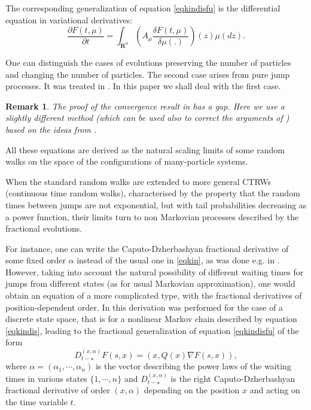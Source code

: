 \documentclass[12pt]{article}
\def\R{\mathbf{R}}
\def\al{\alpha}
\def\pa{\partial}
\def\de{\delta}
\numberwithin{equation}{section}
\newtheorem{remark}{Remark}
\begin{document}
The corresponding generalization of equation \eqref{eqkindisfu} is the differential equation
in variational derivatives:
\begin{equation}
\label{eqkinfu}
\frac{\pa F(t,\mu)}{\pa t} =\int_{\R^d} \left(A_{\mu} \frac{\de F(t,\mu)}{\de \mu (.)}\right)(z) \mu(dz).
\end{equation}

One can distinguish the cases of evolutions preserving the number of particles
and changing the number of particles. The second case arises from pure jump processes.
It was treated in \cite{KoTr21}. In this paper we shall deal with the first case.

\begin{remark} The proof of the convergence result in \cite{KoTr21} has a gap. Here we use a slightly
different method (which can be used also to correct the arguments of \cite{KoTr21})
 based on the ideas from \cite{Ko09,Ko22}.
\end{remark}


All these equations are derived as the natural scaling limits of some random walks on the space of the
configurations of many-particle systems.


  When the standard random walks are extended to more general CTRWs
(continuous time random walks), characterised by the property that the random times between
jumps are not exponential, but with tail probabilities decreasing as a power function,
their limits turn to non Markovian processes described by the fractional evolutions.


For instance, one can write the Caputo-Dzherbashyan fractional derivative of some fixed order $\al$ instead
of the usual one in \eqref{eqkin}, as was done e.g. in \cite{KochKondr17}.
However, taking into account the natural possibility of different waiting times for jumps from different states
(as for usual Markovian approximation), one would obtain an equation
of a more complicated type, with the fractional derivatives of position-dependent order.
In \cite{KolMal} this derivation was performed for the case of a discrete state space, that is for a nonlinear Markov chain
described by equation \eqref{eqkindis}, leading to the fractional generalization of equation \eqref{eqkindisfu} of the form
\begin{equation}
\label{frackineqdis}
D_{t-\star}^{(x,\al)} F(s,x)=(x,Q(x) \nabla F(s,x)),
\end{equation}
where $\al=(\al_1, \cdots, \al_n)$ is the vector describing the power laws of the waiting times in
various states $\{1, \cdots, n\}$ and $D_{t-\star}^{(x,\al)}$ is the right Caputo-Dzherbashyan fractional
derivative of order $(x,\al)$ depending on the position $x$ and acting on the time variable $t$.
\end{document}

